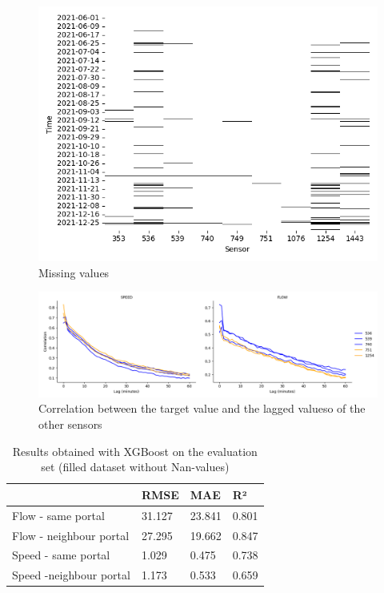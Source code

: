 	\begin{figure}[H]
		\centering
		\includegraphics[width =0.5 \linewidth]{../Plots/missingvalues}
		\caption{Missing values}
		\label{fig:missingvalues}
	\end{figure}
	\begin{figure}[H]
		\centering
		\includegraphics[width =0.99 \linewidth]{../Plots/Correlation_lag_flow_speed_peak}
		\caption{Correlation between the target value and the lagged valueso of the other sensors}
		\label{fig:correlation_lag}
	\end{figure}
	\begin{table}[H]
		\centering
		\caption{Results obtained with XGBoost on the evaluation set (filled dataset without Nan-values)}
		\label{tab:result_xgb_evaluation}
		\begin{tabular}{l|lll}
			& RMSE   & MAE    & R²    \\
			\hline
			Flow - same portal      &31.127 & 23.841 & 0.801\\
			Flow - neighbour portal &  27.295 &19.662 &0.847\\
			Speed - same portal     &1.029 & 0.475& 0.738\\
			Speed -neighbour portal & 1.173 & 0.533 & 0.659
		\end{tabular}
	\end{table}
